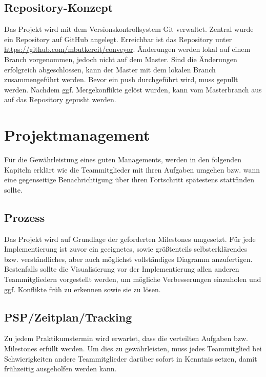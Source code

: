 \documentclass[a4paper, 11pt]{article}
\begin{document}
\newpage

\subsection{Repository-Konzept}
Das Projekt wird mit dem Versionskontrollsystem Git verwaltet. Zentral wurde ein Repository auf GitHub angelegt. Erreichbar ist das Repository unter \url{https://github.com/mbutkereit/conveyor}. Änderungen werden lokal auf einem Branch vorgenommen, jedoch nicht auf dem Master. Sind die Änderungen erfolgreich abgeschlossen, kann der Master mit dem lokalen Branch zusammengeführt werden. Bevor ein push durchgeführt wird, muss gepullt werden. Nachdem ggf. Mergekonflikte gelöst wurden, kann vom Masterbranch aus auf das Repository gepusht werden.

\section{Projektmanagement}
Für die Gewährleistung eines guten Managements, werden in den folgenden Kapiteln erklärt wie die Teammitglieder mit ihren Aufgaben umgehen bzw. wann eine gegenseitige Benachrichtigung über ihren Fortschritt spätestens stattfinden sollte.

\subsection{Prozess}
Das Projekt wird auf Grundlage der geforderten Milestones umgesetzt. Für jede Implementierung ist zuvor ein geeignetes, sowie größtenteils selbsterklärendes bzw. verständliches, aber auch möglichst vollständiges Diagramm anzufertigen. Bestenfalls sollte die Visualisierung vor der Implementierung allen anderen Teammitgliedern vorgestellt werden, um mögliche Verbesserungen einzuholen und ggf. Konflikte früh zu erkennen sowie sie zu lösen.

\subsection{PSP/Zeitplan/Tracking}
Zu jedem Praktikumstermin wird erwartet, dass die verteilten Aufgaben bzw. Milestones erfüllt werden. Um dies zu gewährleisten, muss jedes Teammitglied bei Schwierigkeiten andere Teammitglieder darüber sofort in Kenntnis setzen, damit frühzeitig ausgeholfen werden kann.
\end{document}
